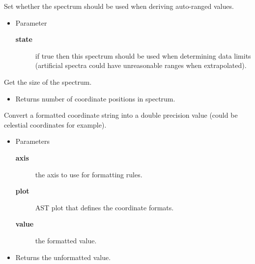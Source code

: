 \begin{desc}Set whether the spectrum should be used when deriving
 auto-ranged values.
\begin{itemize}
\item{Parameter
  \begin{description}
   \item[\textbf{state}]{if true then this spectrum should be used when
             determining data limits (artificial spectra could
             have unreasonable ranges when extrapolated).}
  \end{description}}
\end{itemize}
\end{desc}

\begin{desc}Get the size of the spectrum.
\begin{itemize}
\item{Returns number of coordinate positions in spectrum. }
\end{itemize}
\end{desc}

\begin{desc}Convert a formatted coordinate string into a double precision
 value (could be celestial coordinates for example).
\begin{itemize}
\item{Parameters
  \begin{description}
   \item[\textbf{axis}]{the axis to use for formatting rules.}
   \item[\textbf{plot}]{AST plot that defines the coordinate formats.}
   \item[\textbf{value}]{the formatted value.}
  \end{description}}
\end{itemize}
\begin{itemize}
\item{Returns the unformatted value. }
\end{itemize}
\end{desc}





